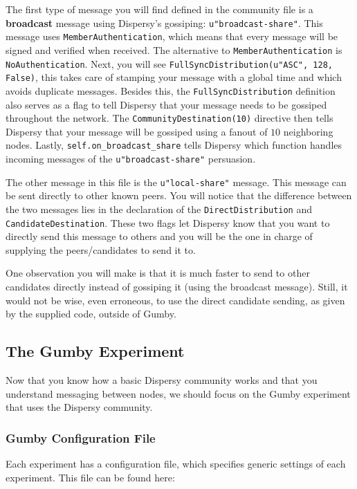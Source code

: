 \documentclass{article}
\begin{document}
The first type of message you will find defined in the community file is a \textbf{broadcast} message using Dispersy's gossiping: \texttt{u"broadcast-share"}.
This message uses \texttt{MemberAuthentication}, which means that every message will be signed  and verified when received.
The alternative to \texttt{MemberAuthentication} is \texttt{NoAuthentication}.
Next, you will see \texttt{FullSyncDistribution(u"ASC", 128, False)}, this takes care of stamping your message with a global time and which avoids duplicate messages.
Besides this, the \texttt{FullSyncDistribution} definition also serves as a flag to tell Dispersy that your message needs to be gossiped throughout the network.
The \texttt{CommunityDestination(10)} directive then tells Dispersy that your message will be gossiped using a fanout of $10$ neighboring nodes.
Lastly, \texttt{self.on\_broadcast\_share} tells Dispersy which function handles incoming messages of the \texttt{u"broadcast-share"} persuasion.

The other message in this file is the \texttt{u"local-share"} message.
This message can be sent directly to other known peers.
You will notice that the difference between the two messages lies in the declaration of the \texttt{DirectDistribution} and \texttt{CandidateDestination}.
These two flags let Dispersy know that you want to directly send this message to others and you will be the one in charge of supplying the peers/candidates to send it to.

One observation you will make is that it is much faster to send to other candidates directly instead of gossiping it (using the broadcast message).
Still, it would not be wise, even erroneous, to use the direct candidate sending, as given by the supplied code, outside of Gumby.

\subsection{The Gumby Experiment}
Now that you know how a basic Dispersy community works and that you understand messaging between nodes, we should focus on the Gumby experiment that uses the Dispersy community.

\subsubsection{Gumby Configuration File}
Each experiment has a configuration file, which specifies generic settings of each experiment.
This file can be found here:
\end{document}
